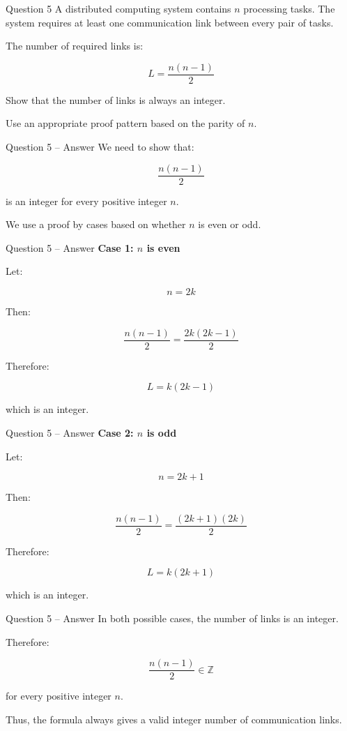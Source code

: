 
\begin{frame}{Question 5}
A distributed computing system contains $n$ processing tasks. The system
requires at least one communication link between every pair of tasks.

The number of required links is:

$$
L=\frac{n(n-1)}{2}
$$

Show that the number of links is always an integer.

Use an appropriate proof pattern based on the parity of $n$.
\end{frame}

\begin{frame}{Question 5 -- Answer}
We need to show that:

$$
\frac{n(n-1)}{2}
$$

is an integer for every positive integer $n$.

We use a proof by cases based on whether $n$ is even or odd.
\end{frame}

\begin{frame}{Question 5 -- Answer}
\textbf{Case 1: $n$ is even}

Let:

$$
n=2k
$$

Then:

$$
\frac{n(n-1)}{2}
=
\frac{2k(2k-1)}{2}
$$

Therefore:

$$
L=k(2k-1)
$$

which is an integer.
\end{frame}

\begin{frame}{Question 5 -- Answer}
\textbf{Case 2: $n$ is odd}

Let:

$$
n=2k+1
$$

Then:

$$
\frac{n(n-1)}{2}
=
\frac{(2k+1)(2k)}{2}
$$

Therefore:

$$
L=k(2k+1)
$$

which is an integer.
\end{frame}

\begin{frame}{Question 5 -- Answer}
In both possible cases, the number of links is an integer.

Therefore:

$$
\boxed{\frac{n(n-1)}{2}\in\mathbb{Z}}
$$

for every positive integer $n$.

Thus, the formula always gives a valid integer number of communication
links.
\end{frame}
